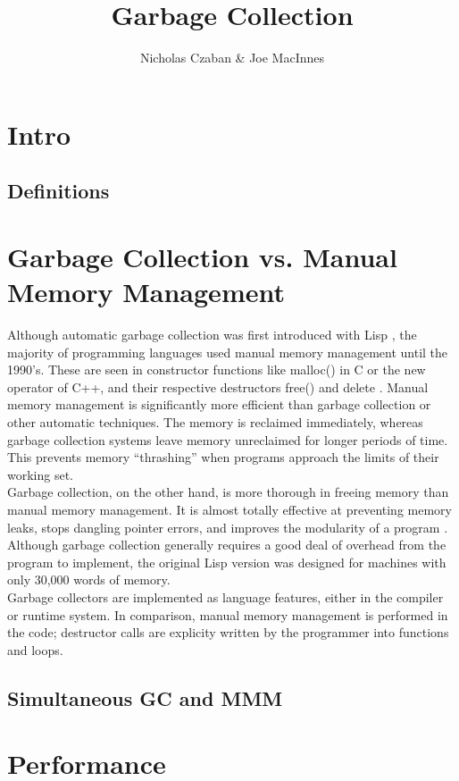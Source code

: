 \documentclass{article}
\begin{document}
\title{Garbage Collection}
\author{Nicholas Czaban \& Joe MacInnes}
\maketitle
\section{Intro}
\subsection{Definitions}
\section{Garbage Collection vs. Manual Memory Management}
Although automatic garbage collection was first introduced with Lisp \cite{chis11}, the majority of programming languages used manual memory management until the 1990's. These are seen in constructor functions like malloc() in C or the new operator of C++, and their respective destructors free() and delete \cite{pythDocs}. Manual memory management is significantly more efficient than garbage collection or other automatic techniques. The memory is reclaimed immediately, whereas garbage collection systems leave memory unreclaimed for longer periods of time. This prevents memory ``thrashing'' when programs approach the limits of their working set.\\

Garbage collection, on the other hand, is more thorough in freeing memory than manual memory management. It is almost totally effective at preventing memory leaks, stops dangling pointer errors, and improves the modularity of a program \cite{hertz05}. Although garbage collection generally requires a good deal of overhead from the program to implement, the original Lisp version was designed for machines with only 30,000 words of memory.\\

Garbage collectors are implemented as language features, either in the compiler or runtime system. In comparison, manual memory management is performed in the code; destructor calls are explicity written by the programmer into functions and loops.
\subsection{Simultaneous GC and MMM}

\section{Performance}
\end{document}
